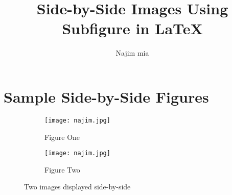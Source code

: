 \documentclass[12pt,a4paper]{article}
\title{Side-by-Side Images Using Subfigure in LaTeX}
\author{Najim mia}
\date{}
\begin{document}
\maketitle

\section*{Sample Side-by-Side Figures}

\begin{figure}[h!]
    \centering
    \begin{subfigure}[b]{0.45\textwidth}
        \centering
        \texttt{[image: najim.jpg]}
        \caption{Figure One}
        \label{fig:one}
    \end{subfigure}
    \hfill
    \begin{subfigure}[b]{0.45\textwidth}
        \centering
        \texttt{[image: najim.jpg]}
        \caption{Figure Two}
        \label{fig:two}
    \end{subfigure}
    \caption{Two images displayed side-by-side}
    \label{fig:sidebyside}
\end{figure}
\end{document}

